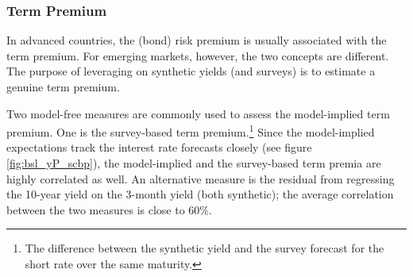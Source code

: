 {\subsubsection{Term Premium} \label{sec:TP}
\iftoggle{toclinks}{\gototoc}{} %

In advanced countries, the (bond) risk premium is usually associated with the term premium.
For emerging markets, however, the two concepts are different.
The purpose of leveraging on synthetic yields (and surveys) is to estimate a genuine term premium.

Two model-free measures are commonly used to assess the model-implied term premium.
One is the survey-based term premium.\footnote{ The difference between the synthetic yield and the survey forecast for the short rate over the same maturity.}
Since the model-implied expectations track the interest rate forecasts closely (see figure \ref{fig:bsl_yP_scbp}), the model-implied and the survey-based term premia are highly correlated as well.
An alternative measure is the residual from regressing the 10-year yield on the 3-month yield (both synthetic); the average correlation between the two measures is close to 60\%.

}
